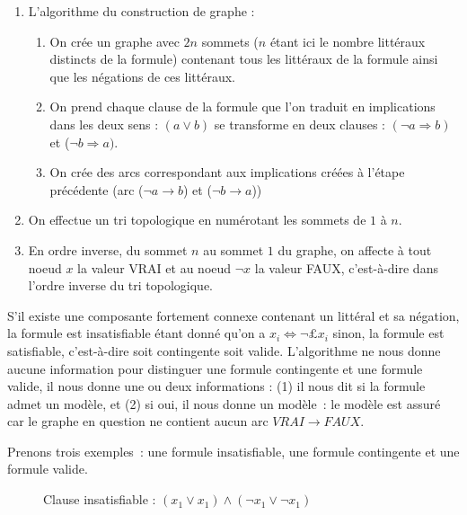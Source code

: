 \documentclass{article}
\begin{document}
\begin{enumerate}
\item L'algorithme du construction de graphe : 
\begin{enumerate}
\item On crée un graphe avec $2n$ sommets ($n$ étant ici le nombre littéraux distincts de la formule) contenant tous les littéraux de la formule ainsi que les négations de ces littéraux.
\item On prend chaque clause de la formule que l'on traduit en implications dans les deux sens : $(a \vee b)$ 
se transforme en deux clauses : $(\neg a \Rightarrow b)$ et ($\neg b \Rightarrow a)$.
\item On crée des arcs correspondant aux implications créées à l'étape précédente (arc ($\neg a 
\rightarrow b$) et ($\neg b \rightarrow a$))
\end{enumerate}
\item On effectue un tri topologique en numérotant les sommets de $1$ à $n$.
\item En ordre inverse, du sommet $n$ au sommet $1$ du graphe, on affecte à tout noeud $x$ la valeur VRAI et au noeud $\neg x$ la valeur FAUX, c'est-à-dire dans l'ordre inverse du tri topologique.
\end{enumerate}  	

S'il existe une composante fortement connexe contenant un littéral et sa négation, la formule est insatisfiable étant donné qu'on a $x_{i} \Leftrightarrow \neg £x_{i}$ sinon, la formule est satisfiable, c'est-à-dire soit contingente soit valide. L'algorithme ne nous donne aucune information pour distinguer une formule contingente et une formule valide, il nous donne une ou deux informations : (1) il nous dit si la formule admet un modèle, et (2) si oui, il nous donne un modèle~: le modèle est assuré car le graphe en question ne contient aucun arc $VRAI \rightarrow FAUX$.

Prenons trois exemples~: une formule insatisfiable, une formule contingente et une formule valide.

\begin{figure}[h!]
  \centering
  \caption{Clause insatisfiable : $(x_{1} \vee x_{1}) \wedge (\neg x_{1} \vee \neg x_{1})$}
  \label{fig:clause-insat}
\end{figure}
\end{document}

